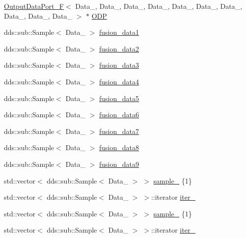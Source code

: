 \begin{DoxyCompactItemize}
\hyperlink{classOutputDataPort__F}{Output\+Data\+Port\+\_\+F}$<$ Data\+\_, Data\+\_, Data\+\_, Data\+\_, Data\+\_, Data\+\_, Data\+\_, Data\+\_, Data\+\_, Data\+\_ $>$ $\ast$ \hyperlink{classFusion__operator_a3afeb436d521b3c232ac41e26193ef3b}{O\+DP}
\item 
dds\+::sub\+::\+Sample$<$ Data\+\_ $>$ \hyperlink{classFusion__operator_accd0def1ab312df9918676814257da82}{fusion\+\_\+data1}
\item 
dds\+::sub\+::\+Sample$<$ Data\+\_ $>$ \hyperlink{classFusion__operator_a8c545bb751bfdda39be20b56b4aa7cbc}{fusion\+\_\+data2}
\item 
dds\+::sub\+::\+Sample$<$ Data\+\_ $>$ \hyperlink{classFusion__operator_a983008a895d0902a9aafc471af7681a5}{fusion\+\_\+data3}
\item 
dds\+::sub\+::\+Sample$<$ Data\+\_ $>$ \hyperlink{classFusion__operator_a40f85d88738eca58c412f0b70792678f}{fusion\+\_\+data4}
\item 
dds\+::sub\+::\+Sample$<$ Data\+\_ $>$ \hyperlink{classFusion__operator_a770f79170f64f611facd933ebb1c9b58}{fusion\+\_\+data5}
\item 
dds\+::sub\+::\+Sample$<$ Data\+\_ $>$ \hyperlink{classFusion__operator_ab60db5c3be3d0512a35c4231616383c4}{fusion\+\_\+data6}
\item 
dds\+::sub\+::\+Sample$<$ Data\+\_ $>$ \hyperlink{classFusion__operator_a12845b96c8a2a00cbf7290462e2fa215}{fusion\+\_\+data7}
\item 
dds\+::sub\+::\+Sample$<$ Data\+\_ $>$ \hyperlink{classFusion__operator_ac3ddeea7acd61121e02501cbffc2b7be}{fusion\+\_\+data8}
\item 
dds\+::sub\+::\+Sample$<$ Data\+\_ $>$ \hyperlink{classFusion__operator_af352606f5dcf540b5e9beb72870c9fa6}{fusion\+\_\+data9}
\item 
std\+::vector$<$ dds\+::sub\+::\+Sample$<$ Data\+\_ $>$ $>$ \hyperlink{classFusion__operator_ab24eda6a56115e1eb0ab2c89a2632436}{sample\+\_} \{1\}
\item 
std\+::vector$<$ dds\+::sub\+::\+Sample$<$ Data\+\_ $>$ $>$\+::iterator \hyperlink{classFusion__operator_ab0adcc22beac8918ea3e22b04f1d31d3}{iter\+\_}
\item 
std\+::vector$<$ dds\+::sub\+::\+Sample$<$ Data\+\_ $>$ $>$ \hyperlink{classFusion__operator_afe367eeae918067d7d26c90bc0be202d}{sample\+\_} \{1\}
\item 
std\+::vector$<$ dds\+::sub\+::\+Sample$<$ Data\+\_ $>$ $>$\+::iterator \hyperlink{classFusion__operator_a4d552a9a1ab0911598232059cb0937bc}{iter\+\_}

\end{DoxyCompactItemize}
